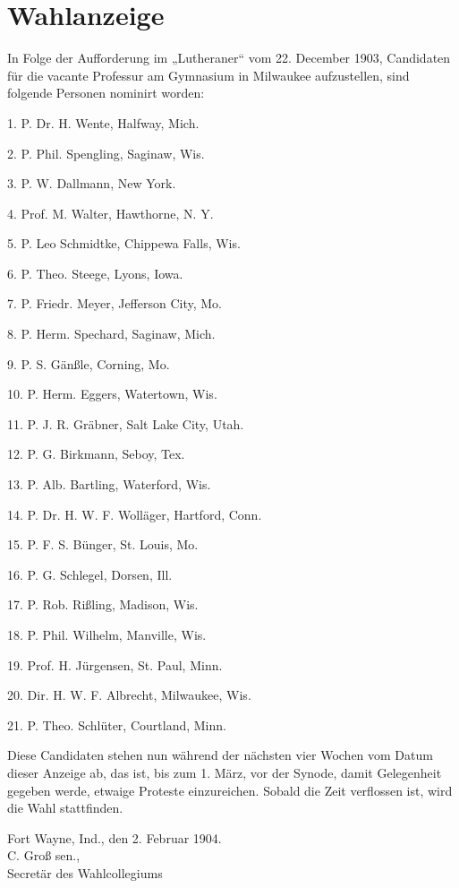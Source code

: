 \chapter{Wahlanzeige}

In Folge der Aufforderung im „Lutheraner“ vom 22. December 1903, Candidaten für die vacante Professur am Gymnasium in Milwaukee aufzustellen, sind folgende Personen nominirt worden:

1. P. Dr. H. Wente, Halfway, Mich.

2. P. Phil. Spengling, Saginaw, Wis.

3. P. W. Dallmann, New York.

4. Prof. M. Walter, Hawthorne, N. Y.

5. P. Leo Schmidtke, Chippewa Falls, Wis.

6. P. Theo. Steege, Lyons, Iowa.

7. P. Friedr. Meyer, Jefferson City, Mo.

8. P. Herm. Spechard, Saginaw, Mich.

9. P. S. Gänßle, Corning, Mo.

10. P. Herm. Eggers, Watertown, Wis.

11. P. J. R. Gräbner, Salt Lake City, Utah.

12. P. G. Birkmann, Seboy, Tex.

13. P. Alb. Bartling, Waterford, Wis.

14. P. Dr. H. W. F. Wolläger, Hartford, Conn.

15. P. F. S. Bünger, St. Louis, Mo.

16. P. G. Schlegel, Dorsen, Ill.

17. P. Rob. Rißling, Madison, Wis.

18. P. Phil. Wilhelm, Manville, Wis.

19. Prof. H. Jürgensen, St. Paul, Minn.

20. Dir. H. W. F. Albrecht, Milwaukee, Wis.

21. P. Theo. Schlüter, Courtland, Minn.

Diese Candidaten stehen nun während der nächsten vier Wochen vom Datum dieser Anzeige ab, das ist, bis zum 1. März, vor der Synode, damit Gelegenheit gegeben werde, etwaige Proteste einzureichen. Sobald die Zeit verflossen ist, wird die Wahl stattfinden.

\begin{unterschrift}
Fort Wayne, Ind., den 2. Februar 1904.\\
C. Groß sen.,\\
Secretär des Wahlcollegiums
\end{unterschrift}
